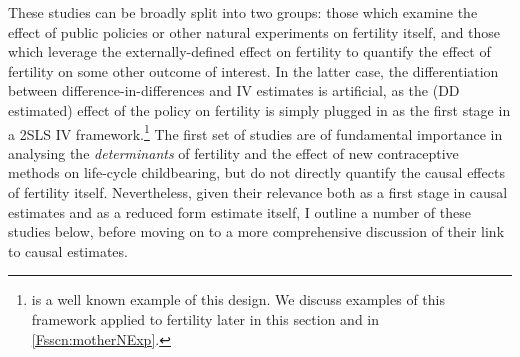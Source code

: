 These studies can be broadly split into two groups: those which examine the
effect of public policies or other natural experiments on fertility itself,
and those which leverage the externally-defined effect on fertility to quantify
the effect of fertility on some other outcome of interest. In the latter case, 
the differentiation between difference-in-differences and IV estimates is 
artificial, as the (DD estimated) effect of the policy on fertility is 
simply plugged in as the first stage in a 2SLS IV framework.\footnote{
\citet{Duflo2001} is a well known example of this design.  We discuss examples 
of this framework applied to fertility later in this section and in 
\ref{Fsscn:motherNExp}.} The first set of studies are of fundamental importance 
in analysing the \emph{determinants} of fertility and the effect of new 
contraceptive methods on life-cycle childbearing, but do not directly quantify 
the causal effects of fertility itself.  Nevertheless, given their relevance both 
as a first stage in causal estimates and as a reduced form estimate itself, I 
outline a number of these studies below, before moving on to a more comprehensive 
discussion of their link to causal estimates.

